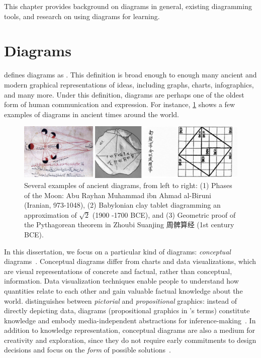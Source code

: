 This chapter provides background on diagrams in general, existing diagramming tools, and research on using diagrams for learning.

\section{Diagrams}

\citet{tversky_diagrams_2017,tversky_visualizing_2011} defines diagrams as . This definition is broad enough to enough many ancient and modern graphical representations of ideas, including graphs, charts, infographics, and many more. Under this definition, diagrams are perhaps one of the oldest form of human communication and expression. For instance, \cref{fig:ancient-diagrams} shows a few examples of diagrams in ancient times around the world. 

\begin{figure}
    \centering
    \includegraphics[width=\linewidth]{assets/related-work/historical-diagrams.pdf}
    \caption{Several examples of ancient diagrams, from left to right: (1) Phases of the Moon: Abu Rayhan Muhammad ibn Ahmad al-Biruni (Iranian, 973-1048), (2) Babylonian clay tablet diagramming an approximation of $\sqrt{2}$ (1900 -1700 BCE), and (3) Geometric proof of the Pythagorean theorem in Zhoubi Suanjing 周髀算经 (1st century BCE).}
    \label{fig:ancient-diagrams}
\end{figure}

% 

In this dissertation, we focus on a particular kind of diagrams: \textit{conceptual} diagrams~\cite{naturalDiagramming}. Conceptual diagrams differ from charts and data visualizations, which are visual representations of concrete and factual, rather than conceptual, information. Data visualization techniques enable people to understand how quantities relate to each other and gain valuable factual knowledge about the world. \citet{designWithDiagrams} distinguishes between \emph{pictorial} and \emph{propositional} graphics: instead of directly depicting data, diagrams (propositional graphics in \citeauthor{designWithDiagrams}'s terms) constitute knowledge and embody media-independent abstractions for inference-making~\cite{whyDiagramWorth}. In addition to knowledge representation, conceptual diagrams are also a medium for creativity and exploration, since they do not require early commitments to design decisions and focus on the \emph{form} of possible solutions~\cite{ConceptualArchDesign}.

